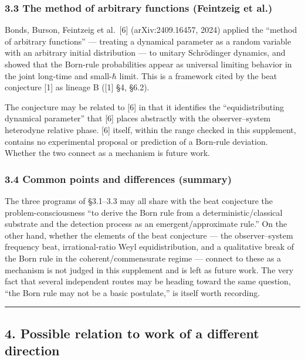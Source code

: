 \documentclass[
]{ltjsarticle}
\begin{document}
\subsubsection{3.3 The method of arbitrary functions (Feintzeig et
al.)}\label{the-method-of-arbitrary-functions-feintzeig-et-al.}

Bonds, Burson, Feintzeig et al.~{[}6{]} (arXiv:2409.16457, 2024) applied
the ``method of arbitrary functions'' --- treating a dynamical parameter
as a random variable with an arbitrary initial distribution --- to
unitary Schrödinger dynamics, and showed that the Born-rule
probabilities appear as universal limiting behavior in the joint
long-time and small-\(\hbar\) limit. This is a framework cited by the
beat conjecture {[}1{]} as lineage B ({[}1{]} §4, §6.2).

The conjecture may be related to {[}6{]} in that it identifies the
``equidistributing dynamical parameter'' that {[}6{]} places abstractly
with the observer--system heterodyne relative phase. {[}6{]} itself,
within the range checked in this supplement, contains no experimental
proposal or prediction of a Born-rule deviation. Whether the two connect
as a mechanism is future work.

\subsubsection{3.4 Common points and differences
(summary)}\label{common-points-and-differences-summary}

The three programs of §3.1--3.3 may all share with the beat conjecture
the problem-consciousness ``to derive the Born rule from a
deterministic/classical substrate and the detection process as an
emergent/approximate rule.'' On the other hand, whether the elements of
the beat conjecture --- the observer--system frequency beat,
irrational-ratio Weyl equidistribution, and a qualitative break of the
Born rule in the coherent/commensurate regime --- connect to these as a
mechanism is not judged in this supplement and is left as future work.
The very fact that several independent routes may be heading toward the
same question, ``the Born rule may not be a basic postulate,'' is itself
worth recording.

\begin{center}\rule{0.5\linewidth}{0.5pt}\end{center}

\subsection{4. Possible relation to work of a different
direction}\label{possible-relation-to-work-of-a-different-direction}
\end{document}
